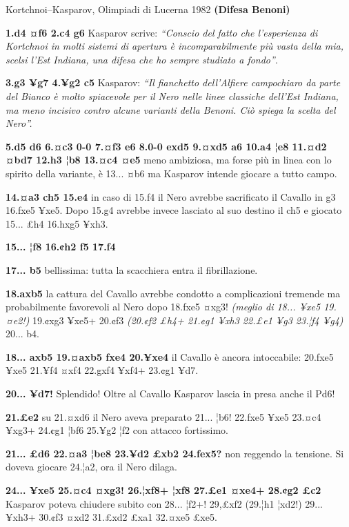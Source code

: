 Kortchnoi--Kasparov, Olimpiadi di Lucerna 1982 \textbf{(Difesa Benoni)}

\textbf{1.d4 ¤f6 2.c4 g6} Kasparov scrive: \emph{``Conscio del fatto che
l'esperienza di Kortchnoi in molti sistemi di apertura è
incomparabilmente più vasta della mia, scelsi l'Est Indiana, una difesa
che ho sempre studiato a fondo''}.

\textbf{3.g3 ¥g7 4.¥g2 c5} Kasparov: \emph{``Il fianchetto dell'Alfiere
campochiaro da parte del Bianco è molto spiacevole per il Nero nelle
linee classiche dell'Est Indiana, ma meno incisivo contro alcune
varianti della Benoni. Ciò spiega la scelta del Nero''.}

\textbf{5.d5 d6 6.¤c3 0-0 7.¤f3 e6 8.0-0 exd5 9.¤xd5 a6 10.a4 ¦e8 11.¤d2
¤bd7 12.h3 ¦b8 13.¤c4 ¤e5} meno ambiziosa, ma forse più in linea con lo
spirito della variante, è 13... ¤b6 ma Kasparov intende giocare a tutto
campo.

\textbf{14.¤a3 ch5 15.e4} in caso di 15.f4 il Nero avrebbe sacrificato
il Cavallo in g3 16.fxe5 ¥xe5. Dopo 15.g4 avrebbe invece lasciato al suo
destino il ch5 e giocato 15... £h4 16.hxg5 ¥xh3.

\textbf{15... ¦f8 16.¢h2 f5 17.f4}


\textbf{17... b5} bellissima: tutta la scacchiera entra il
fibrillazione.

\textbf{18.axb5} la cattura del Cavallo avrebbe condotto a complicazioni
tremende ma probabilmente favorevoli al Nero dopo 18.fxe5 ¤xg3!
\emph{(meglio di 18... ¥xe5 19.¤e2!)} 19.¢xg3 ¥xe5+ 20.¢f3 \emph{(20.¢f2
£h4+ 21.¢g1 ¥xh3 22.£e1 ¥g3 23.¦f4 ¥g4)} 20... b4.

\textbf{18... axb5 19.¤axb5 fxe4 20.¥xe4} il Cavallo è ancora
intoccabile: 20.fxe5 ¥xe5 21.¥f4 ¤xf4 22.gxf4 ¥xf4+ 23.¢g1 ¥d7.

\textbf{20... ¥d7!} Splendido! Oltre al Cavallo Kasparov lascia in presa
anche il Pd6!

\textbf{21.£e2} su 21.¤xd6 il Nero aveva preparato 21... ¦b6! 22.fxe5
¥xe5 23.¤c4 ¥xg3+ 24.¢g1 ¦bf6 25.¥g2 ¦f2 con attacco fortissimo.

\textbf{21... £d6 22.¤a3 ¦be8 23.¥d2 £xb2 24.fex5?} non reggendo la
tensione. Si doveva giocare 24.¦a2, ora il Nero dilaga.

\textbf{24... ¥xe5 25.¤c4 ¤xg3! 26.¦xf8+ ¦xf8 27.£e1 ¤xe4+ 28.¢g2 £c2}
Kasparov poteva chiudere subito con 28... ¦f2+! 29,£xf2 (29.¦h1 ¦xd2!)
29... ¥xh3+ 30.¢f3 ¤xd2 31.£xd2 £xa1 32.¤xe5 £xe5.

